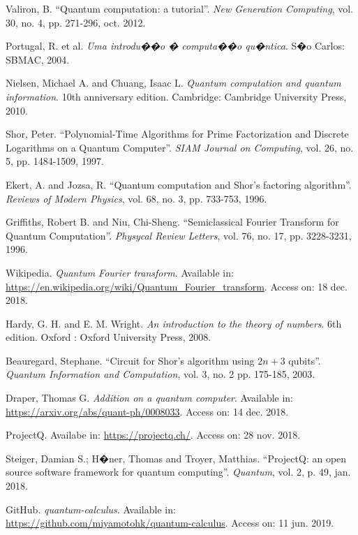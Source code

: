 \documentclass[a4paper, 10pt]{article}
\numberwithin{equation}{section}
\numberwithin{figure}{section}
\numberwithin{table}{section}
\begin{document}
\clearpage
\newpage
\begin{thebibliography}{10}

 Valiron, B. ``Quantum computation: a tutorial''. \textit{New Generation Computing}, vol. 30, no. 4, pp. 271-296, oct. 2012.

 Portugal, R. et al. \textit{Uma introdu��o � computa��o qu�ntica}. S�o Carlos: SBMAC, 2004.

 Nielsen, Michael A. and Chuang, Isaac L. \textit{Quantum computation and quantum information}. 10th anniversary edition. Cambridge: Cambridge University Press, 2010.

 Shor, Peter. ``Polynomial-Time Algorithms for Prime Factorization and Discrete Logarithms on a Quantum Computer''. \textit{SIAM Journal on Computing}, vol. 26, no. 5, pp. 1484-1509, 1997.

 Ekert, A. and Jozsa, R. ``Quantum computation and Shor's factoring algorithm''. \textit{Reviews of Modern Physics}, vol. 68, no. 3, pp. 733-753, 1996.

 Griffiths, Robert B. and Niu, Chi-Sheng. ``Semiclassical Fourier Transform for Quantum Computation''. \textit{Physycal Review Letters}, vol. 76, no. 17, pp. 3228-3231, 1996.

 Wikipedia. \textit{Quantum Fourier transform}. Available in: \url{https://en.wikipedia.org/wiki/Quantum_Fourier_transform}. Access on: 18 dec. 2018.

 Hardy, G. H. and E. M. Wright. \textit{An introduction to the
theory of numbers}. 6th edition. Oxford : Oxford University Press, 2008.

 Beauregard, Stephane. ``Circuit for Shor's algorithm using $2n+3$ qubits''. \textit{Quantum Information and Computation}, vol. 3, no. 2 pp. 175-185, 2003.

 Draper, Thomas G. \textit{Addition on a quantum computer}. Available in: \url{https://arxiv.org/abs/quant-ph/0008033}. Access on: 14 dec. 2018.

 ProjectQ. Availabe in: \url{https://projectq.ch/}. Access on: 28 nov. 2018.

 Steiger, Damian S.; H�ner, Thomas and Troyer, Matthias. ``ProjectQ: an open source software framework for quantum computing''. \textit{Quantum}, vol. 2, p. 49, jan. 2018.

 GitHub. \textit{quantum-calculus}. Available in: \url{https://github.com/miyamotohk/quantum-calculus}. Access on: 11 jun. 2019.


\end{thebibliography}
\end{document}
